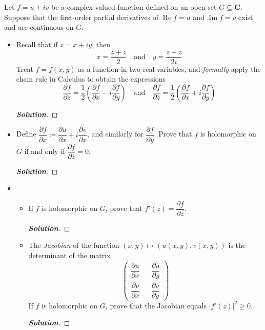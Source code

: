 \documentclass[11pt]{article}
\newenvironment{problem}[2][Problem\!]{\begin{trivlist}
\item[\hskip \labelsep {\bfseries #1}\hskip \labelsep {\bfseries #2.}]}{\end{trivlist}}
\newenvironment{solution}{\begin{proof}[\textbf{\textit{Solution}}]}{\end{proof}}
\newcommand{\cc}{\mathbf C}   %
\newcommand{\abs}[1]{\left\lvert#1\right\rvert} %
\renewcommand{\geq}{\geqslant}
\renewcommand{\Re}{\operatorname{Re}}
\renewcommand{\Im}{\operatorname{Im}}
\begin{document}
\begin{problem}{4.2}
Let $f = u + iv$ be a complex-valued function defined on an open set $G \subseteq \cc$. Suppose that the first-order partial derivatives of $\Re f = u$ and $\Im f = v$ exist and are continuous on $G$.

\begin{itemize}[itemsep=3em]
\item[(a)] Recall that if $z = x + iy$, then
\[x = \frac{z + \overline{z}}{2} \quad \text{and} \quad y = \frac{z - \overline{z}}{2i}\]
Treat $f = f(x,y)$ as a function in two real-variables, and \emph{formally} apply the chain rule in Calculus to obtain the expressions
\[\frac{\partial f}{\partial z} = \frac{1}{2}\left(\frac{\partial f}{\partial x} - i\frac{\partial f}{\partial y}\right) \quad \text{and} \quad \frac{\partial f}{\partial \overline{z}} = \frac{1}{2}\left(\frac{\partial f}{\partial x} + i\frac{\partial f}{\partial y}\right)\]
\begin{solution}
\end{solution}

\item[(b)] Define $\dfrac{\partial f}{\partial x} \coloneqq \dfrac{\partial u}{\partial x} + i\dfrac{\partial v}{\partial x}$, and similarly for $\dfrac{\partial f}{\partial y}$. Prove that $f$ is holomorphic on $G$ if and only if $\dfrac{\partial f}{\partial \overline{z}} = 0$.
\begin{solution}
\end{solution}

\item[(c)] 
\begin{itemize}[itemsep=2em]
\item[(i)] If $f$ is holomorphic on $G$, prove that $f'(z) = \dfrac{\partial f}{\partial z}$.
\begin{solution}
\end{solution}

\item[(ii)] The \emph{Jacobian} of the function $(x,y) \mapsto (u(x,y),v(x,y))$ is the determinant of the matrix
\[\begin{pmatrix}
\dfrac{\partial u}{\partial x} && \dfrac{\partial u}{\partial y}\\[1.5em]
\dfrac{\partial v}{\partial x} && \dfrac{\partial v}{\partial y}
\end{pmatrix}\]
If $f$ is holomorphic on $G$, prove that the Jacobian equals $\abs{f'(z)}^2 \geq 0$.
\begin{solution}
\end{solution}

\end{itemize}
\end{itemize}
\end{problem}
\end{document}
